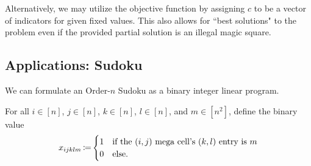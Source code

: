Alternatively, we may utilize the objective function by assigning $c$ to be a vector of indicators for given fixed values. This also allows for ``best solutions" to the problem even if the provided partial solution is an illegal magic square.


\subsection{Applications: Sudoku}
\label{subsec:applications-sudoku}

We can formulate an Order-$n$ Sudoku as a binary integer linear program.

\begin{defn}
    For all $i \in [n]$, $j \in [n]$, $k \in [n]$, $l \in [n]$, and $m \in [n^2]$, define the binary value
    \[
        x_{ijklm} \operatorname*{\coloneqq} \begin{cases}
                            1 & \text{if the } (i,j) \text{ mega cell's } (k,l) \text{ entry is } m \\
                            0 & \text{else}.
                         \end{cases}
    \]
\end{defn}

